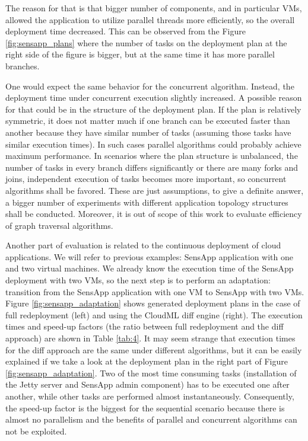 \noindent The reason for that is that bigger number of components, and in particular VMs, allowed the application to utilize parallel threads more efficiently, so the overall deployment time decreased. This can be observed from the Figure \ref{fig:sensapp_plans} where the number of tasks on the deployment plan at the right side of the figure is bigger, but at the same time it has more parallel branches.

\noindent One would expect the same behavior for the concurrent algorithm. Instead, the deployment time under concurrent execution slightly increased. A possible reason for that could be in the structure of the deployment plan. If the plan is relatively symmetric, it does not matter much if one branch can be executed faster than another because they have similar number of tasks (assuming those tasks have similar execution times). In such cases parallel algorithms could probably achieve maximum performance. In scenarios where the plan structure is unbalanced, the number of tasks in every branch differs significantly or there are many forks and joins, independent execution of tasks becomes more important, so concurrent algorithms shall be favored. These are just assumptions, to give a definite answer, a bigger number of experiments with different application topology structures shall be conducted. Moreover, it is out of scope of this work to evaluate efficiency of graph traversal algorithms.

\noindent Another part of evaluation is related to the continuous deployment of cloud applications. We will refer to previous examples: SensApp application with one and two virtual machines. We already know the execution time of the SensApp deployment with two VMs, so the next step is to perform an adaptation: transition from the SensApp application with one VM to SensApp with two VMs. Figure \ref{fig:sensapp_adaptation} shows generated deployment plans in the case of full redeployment (left) and using the CloudML diff engine (right). The execution times and speed-up factors (the ratio between full redeployment and the diff approach) are shown in Table \ref{tab:4}. It may seem strange that execution times for the diff approach are the same under different algorithms, but it can be easily explained if we take a look at the deployment plan in the right part of Figure \ref{fig:sensapp_adaptation}. Two of the most time consuming tasks (installation of the Jetty server and SensApp admin component) has to be executed one after another, while other tasks are performed almost instantaneously. Consequently, the speed-up factor is the biggest for the sequential scenario because there is almost no parallelism and the benefits of parallel and concurrent algorithms can not be exploited.

